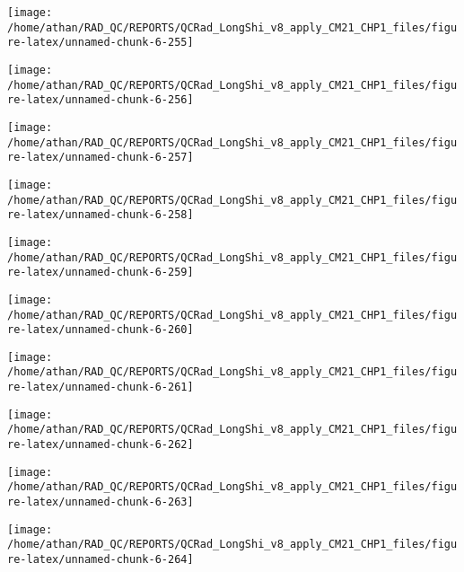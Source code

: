 \documentclass[
  10pt,
  a4paper,oneside]{article}
\begin{document}
\begin{center}\texttt{[image: /home/athan/RAD\_QC/REPORTS/QCRad\_LongShi\_v8\_apply\_CM21\_CHP1\_files/figure-latex/unnamed-chunk-6-255]} \end{center}

\begin{center}\texttt{[image: /home/athan/RAD\_QC/REPORTS/QCRad\_LongShi\_v8\_apply\_CM21\_CHP1\_files/figure-latex/unnamed-chunk-6-256]} \end{center}

\begin{center}\texttt{[image: /home/athan/RAD\_QC/REPORTS/QCRad\_LongShi\_v8\_apply\_CM21\_CHP1\_files/figure-latex/unnamed-chunk-6-257]} \end{center}

\begin{center}\texttt{[image: /home/athan/RAD\_QC/REPORTS/QCRad\_LongShi\_v8\_apply\_CM21\_CHP1\_files/figure-latex/unnamed-chunk-6-258]} \end{center}

\begin{center}\texttt{[image: /home/athan/RAD\_QC/REPORTS/QCRad\_LongShi\_v8\_apply\_CM21\_CHP1\_files/figure-latex/unnamed-chunk-6-259]} \end{center}

\begin{center}\texttt{[image: /home/athan/RAD\_QC/REPORTS/QCRad\_LongShi\_v8\_apply\_CM21\_CHP1\_files/figure-latex/unnamed-chunk-6-260]} \end{center}

\begin{center}\texttt{[image: /home/athan/RAD\_QC/REPORTS/QCRad\_LongShi\_v8\_apply\_CM21\_CHP1\_files/figure-latex/unnamed-chunk-6-261]} \end{center}

\begin{center}\texttt{[image: /home/athan/RAD\_QC/REPORTS/QCRad\_LongShi\_v8\_apply\_CM21\_CHP1\_files/figure-latex/unnamed-chunk-6-262]} \end{center}

\begin{center}\texttt{[image: /home/athan/RAD\_QC/REPORTS/QCRad\_LongShi\_v8\_apply\_CM21\_CHP1\_files/figure-latex/unnamed-chunk-6-263]} \end{center}

\begin{center}\texttt{[image: /home/athan/RAD\_QC/REPORTS/QCRad\_LongShi\_v8\_apply\_CM21\_CHP1\_files/figure-latex/unnamed-chunk-6-264]} \end{center}
\end{document}
